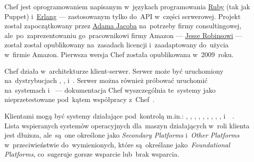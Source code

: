 \documentclass[thesis]{subfiles}
\begin{document}
Chef jest oprogramowaniem napisanym w~językach programowania \href{https://en.wikipedia.org/wiki/Ruby_(programming_language)}{Ruby} (tak jak Puppet) i~\href{https://en.wikipedia.org/wiki/Erlang_(programming_language)}{Erlang} --- zastosowanym tylko do~API w~części serwerowej. Projekt został zapoczątkowany przez \href{https://blog.chef.io/author/adam/}{Adama Jacoba} na~potrzeby firmy consultingowej, ale~po~zaprezentowaniu go~pracownikowi firmy Amazon --- \href{https://en.wikipedia.org/wiki/Jesse_Robbins}{Jesse Robinsowi} --- został został opublikowany na~zasadach licencji  i~zaadaptowany do~użycia w~firmie Amazon. Pierwsza wersja Chef została opublikowana w~2009~roku.

Chef działa w~architekturze klient-serwer. Serwer może być uruchomiony na~dystrybucjach , ,  i~. Serwer można również próbować uruchomić na~systemach  i~ --- dokumentacja Chef wyszczególnia te~systemy jako nieprzetestowane pod~kątem współpracy z~Chef~\cite{chef-supported-platforms}.

Klientami mogą być systemy działające pod~kontrolą m.in.: , , , , , , , , ,  i~~\cite{chef-supported-platforms}. Lista wspieranych systemów operacyjnych dla~maszyn działających w~roli klienta jest dłuższa, ale~są~one określone jako \emph{Secondary Platforms} i~\emph{Other Platforms} w~przeciwieństwie do~wymienionych, które są~określane jako~\emph{Foundational Platforms}, co~sugeruje gorsze wsparcie lub~brak wsparcia.
\end{document}
